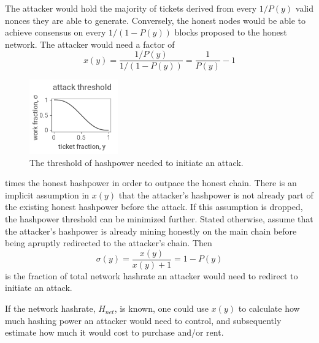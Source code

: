\documentclass[a4paper,12pt]{article}
\begin{document}
The attacker would hold the majority of tickets derived from every $ 1 / P(y) $ valid nonces they are able to generate. Conversely, the honest nodes would be able to achieve consensus on every $ 1 / (1 - P(y)) $ blocks proposed to the honest network. The attacker would need a factor of 
%
\begin{equation}
x(y) = \frac{ 1 / P(y) }{ 1 / ( 1 - P(y) ) } = \frac{ 1 }{ P(y) } - 1
\end{equation}
%
\begin{figure}
  \vspace{-10pt}
  \begin{center}
    	\includegraphics[width=0.34\textwidth]{sigma}
	\vspace{-10pt}
	\begin{minipage}[t]{0.35\textwidth}
	\caption{The threshold of hashpower needed to initiate an attack. \label{sigmafig}}	
	\end{minipage}
	\vspace{0pt}
  \end{center}
\end{figure}
%
times the honest hashpower in order to outpace the honest chain. There is an implicit assumption in $ x(y) $ that the attacker's hashpower is not already part of the existing honest hashpower before the attack. If this assumption is dropped, the hashpower threshold can be minimized further. Stated otherwise, assume that the attacker's hashpower is already mining honestly on the main chain before being apruptly redirected to the attacker's chain. Then
%
\begin{equation}
\label{sigmaeq}
\sigma(y) = \frac{ x(y) }{ x(y) + 1 } = 1 - P(y)
\end{equation}
%
is the fraction of total network hashrate an attacker would need to redirect to initiate an attack. 

If the network hashrate, $ H_{net} $, is known, one could use $ x(y) $ to calculate how much hashing power an attacker would need to control, and subsequently estimate how much it would cost to purchase and/or rent. 
\end{document}
